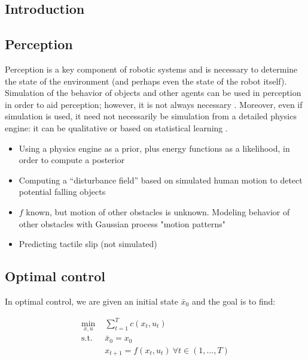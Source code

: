 \documentclass[12pt]{article}
\begin{document}

\subsection*{Introduction}

\subsection*{Perception}

Perception is a key component of robotic systems and is necessary to determine the state of the environment (and perhaps even the state of the robot itself). Simulation of the behavior of objects and other agents can be used in perception in order to aid perception; however, it is not always necessary \citep{Veiga2015}. Moreover, even if simulation is used, it need not necessarily be simulation from a detailed physics engine: it can be qualitative \citep{Brand1995,Forbus2011} or based on statistical learning \citep{Zheng2014,Aoude2013}.

\begin{itemize}
\item Using a physics engine as a prior, plus energy functions as a likelihood, in order to compute a posterior \citep{Schulman2013b}
\item Computing a ``disturbance field'' based on simulated human motion to detect potential falling objects \citep{Zheng2014}
\item $f$ known, but motion of other obstacles is unknown. Modeling behavior of other obstacles with Gaussian process "motion patterns" \citep{Aoude2013}
\item Predicting tactile slip (not simulated) \citep{Veiga2015}
\end{itemize}

\subsection*{Optimal control}

In optimal control, we are given an initial state $\bar{x}_0$ and the goal is to find:

\begin{align*}
\min_{x,u} & \sum_{t=1}^T c(x_t,u_t)\\
\mathrm{s.t.}\ \ \ & \bar{x}_0 = x_0\\
& x_{t+1}=f(x_t,u_t)\ \forall t\in(1,\ldots{},T)
\end{align*}
\end{document}
